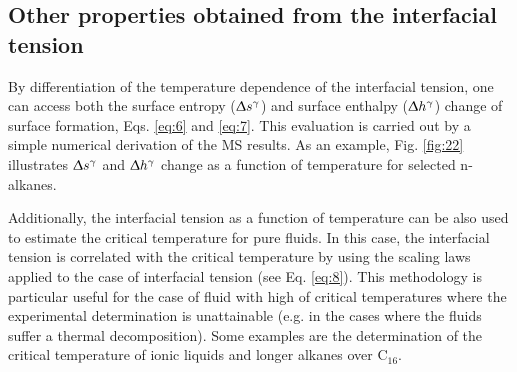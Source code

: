 \documentclass[9pt,bestpractices]{livecoms}
\begin{document}
\subsection{Other properties obtained from the interfacial tension}

By differentiation of the temperature dependence of the interfacial tension,
one can access both  the surface entropy (${\Updelta}s^{{\gamma}}$)
and surface enthalpy (${\Updelta}h^{{\gamma}}$) change of surface
formation, Eqs. \ref{eq:6} and \ref{eq:7}. This evaluation is carried out by a simple
numerical derivation of the MS results. As an example, Fig. \ref{fig:22} illustrates
${\Updelta}s^{\mathrm{{\gamma}}}$ and
${\Updelta}h^{\mathrm{{\gamma}}}$ change as a function of
temperature for selected n-alkanes.

Additionally, the interfacial tension as a function of temperature can be also
used to estimate the critical temperature for pure fluids. In this case, the
interfacial tension is correlated with the critical temperature by using the
scaling laws applied to the case of interfacial tension (see Eq. \ref{eq:8}).
This methodology is particular useful for the case of fluid with high of
critical temperatures where the experimental determination is unattainable 
(e.g. in the cases where the fluids suffer a thermal decomposition). Some examples
are the determination of the critical temperature of ionic liquids and
longer alkanes over C$_{16}$.
\end{document}
